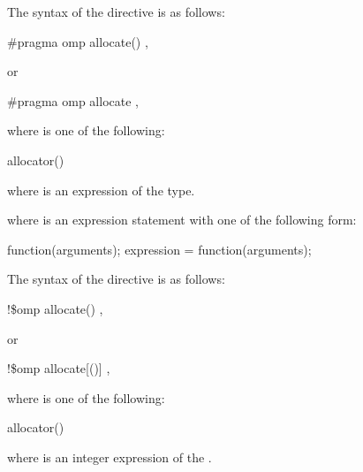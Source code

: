 \syntax
\begin{ccppspecific}
The syntax of the  directive is as follows:

\begin{boxedcode}
\#pragma omp allocate() \plc{[clause[ [ [},\plc{] clause] ... ]] new-line}
\end{boxedcode}

or

\begin{boxedcode}
\#pragma omp allocate \plc{[clause[ [ [},\plc{] clause] ... ]] new-line}
\end{boxedcode}

where  is one of the following:

\begin{indentedcodelist}
allocator()
\end{indentedcodelist}

where  is an expression of the  type.

where  is an expression statement with one of the following form:
\begin{codepar}
    function(arguments);
    expression = function(arguments);
\end{codepar}

\end{ccppspecific}
\medskip

\begin{fortranspecific}
\fortranspecificstart
The syntax of the  directive is as follows:

\begin{boxedcode}
!\$omp allocate() \plc{[clause[ [ [},\plc{] clause] ... ]]}
\end{boxedcode}

or
\begin{boxedcode}
!\$omp allocate[()] \plc{clause[ [ [},\plc{] clause] ... ]}
\end{boxedcode}

where  is one of the following:

\begin{indentedcodelist}
allocator()
\end{indentedcodelist}

where  is an integer expression of the  .

\end{fortranspecific}

